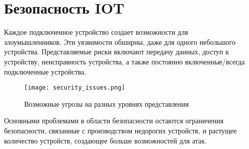 \section{Безопасность IOT}
Каждое подключенное устройство создает возможности для \\злоумышленников. Эти уязвимости обширны, даже
для одного небольшого устройства. Представляемые риски включают передачу данных, доступ к устройству, неисправность
устройства, а также постоянно включенные/всегда подключенные устройства.\cite{DeisgOfIOT}
\begin{figure}[h!]
    \centering
    \texttt{[image: security\_issues.png]}
    \caption{Возможные угрозы на разных уровнях представления}
    \label{fig:section7:security_issues}
\end{figure}
Основными проблемами в области безопасности остаются ограничения безопасности, связанные с производством недорогих устройств, и растущее количество устройств, создающее больше возможностей для атак.

